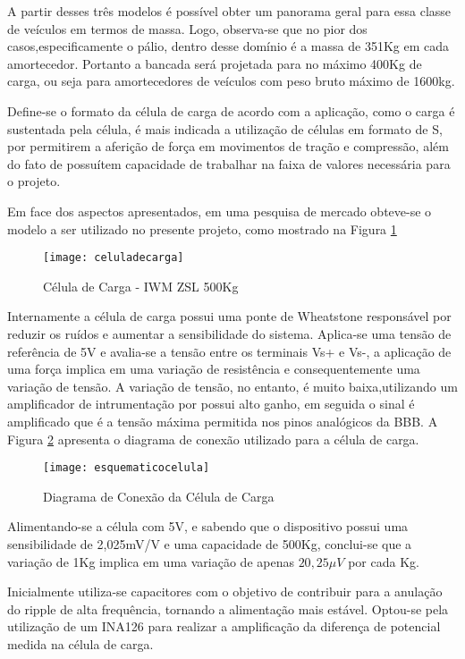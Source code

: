 			A partir desses três modelos é possível obter um panorama geral para essa classe de veículos em termos de massa. Logo, observa-se que no pior dos casos,especificamente o pálio, dentro desse domínio é a massa de 351Kg em cada amortecedor. Portanto a bancada será projetada para no máximo 400Kg de carga, ou seja para amortecedores de veículos com peso bruto máximo de 1600kg. 
			
			Define-se o formato da célula de carga de acordo com a aplicação, como o carga é sustentada pela célula, é mais indicada a utilização de células em formato de S, por permitirem a aferição de força em movimentos de tração e compressão, além do fato de possuítem capacidade de trabalhar na faixa de valores necessária para o projeto.
			
			Em face dos aspectos apresentados, em uma pesquisa de mercado obteve-se o modelo a ser utilizado no presente projeto, como mostrado na Figura \ref{celuladecarga}
			
		\begin{figure}[!h]
			\centering
			\texttt{[image: celuladecarga]}
			\caption{Célula de Carga - IWM ZSL 500Kg}
			\label{celuladecarga}
		\end{figure}

		Internamente a célula de carga possui uma ponte de Wheatstone responsável por reduzir os ruídos e aumentar a sensibilidade do sistema. Aplica-se uma tensão de referência de 5V e avalia-se a tensão entre os terminais Vs+ e Vs-, a aplicação de uma força implica em uma variação de resistência e consequentemente uma variação de tensão. A variação de tensão, no entanto, é muito baixa,utilizando um amplificador de intrumentação por possui alto ganho, em seguida o sinal é amplificado  que é a tensão máxima permitida nos pinos analógicos da BBB. A Figura \ref{esquematicocelula} apresenta o diagrama de conexão utilizado para a célula de carga.

		\begin{figure}[!h]
			\centering
			\texttt{[image: esquematicocelula]}
			\caption{Diagrama de Conexão da Célula de Carga}
			\label{esquematicocelula}
		\end{figure}

		Alimentando-se a célula com 5V, e sabendo que o dispositivo possui uma sensibilidade de 2,025mV/V e uma capacidade de 500Kg, conclui-se que a variação de 1Kg implica em uma variação de apenas $20,25\mu V$ por cada Kg. 

		Inicialmente utiliza-se capacitores com o objetivo de contribuir para a anulação do ripple de alta frequência, tornando a alimentação mais estável. Optou-se pela utilização de um INA126 para realizar a amplificação da diferença de potencial medida na célula de carga. 

